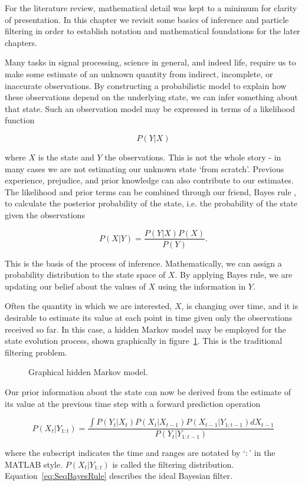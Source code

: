 For the literature review, mathematical detail was kept to a minimum for clarity of presentation. In this chapter we revisit some basics of inference and particle filtering in order to establish notation and mathematical foundations for the later chapters.

Many tasks in signal processing, science in general, and indeed life, require us to make some estimate of an unknown quantity from indirect, incomplete, or inaccurate observations. By constructing a probabilistic model to explain how these observations depend on the underlying state, we can infer something about that state. Such an observation model may be expressed in terms of a likelihood function

\begin{equation}
P(Y|X)
\label{eq:LH}
\end{equation}

where $X$ is the state and $Y$ the observations. This is not the whole story - in many cases we are not estimating our unknown state `from scratch'. Previous experience, prejudice, and prior knowledge can also contribute to our estimates. The likelihood and prior terms can be combined through our friend, Bayes rule \cite{Bayes1763,Laplace1774}, to calculate the posterior probability of the state, i.e. the probability of the state given the observations

\begin{equation}
P(X|Y) = \frac{P(Y|X)P(X)}{P(Y)}.
\label{eq:BayesRule}
\end{equation}

This is the basis of the process of inference. Mathematically, we can assign a probability distribution to the state space of $X$. By applying Bayes rule, we are updating our belief about the values of $X$ using the information in $Y$.

Often the quantity in which we are interested, $X$, is changing over time, and it is desirable to estimate its value at each point in time given only the observations received so far. In this case, a hidden Markov model may be employed for the state evolution process, shown graphically in figure~\ref{fig:HMM}. This is the traditional filtering problem.

\begin{figure}[hbt]%

\caption{Graphical hidden Markov model.}%
\label{fig:HMM}%
\end{figure}

Our prior information about the state can now be derived from the estimate of its value at the previous time step with a forward prediction operation

\begin{equation}
P(X_t|Y_{1:t}) = \frac{\int P(Y_t|X_t)P(X_t|X_{t-1})P(X_{t-1}|Y_{1:t-1}) dX_{t-1}}{P(Y_t|Y_{1:t-1})}
\label{eq:SeqBayesRule}
\end{equation}

where the subscript indicates the time and ranges are notated by `$:$' in the MATLAB style. $P(X_t|Y_{1:t})$ is called the filtering distribution. Equation~\ref{eq:SeqBayesRule} describes the ideal Bayesian filter.